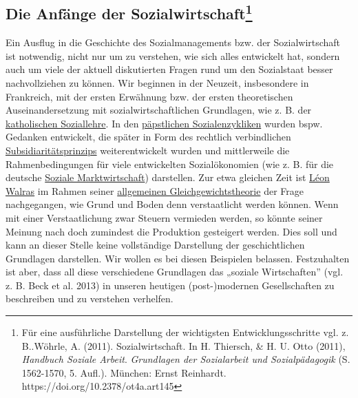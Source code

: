 \documentclass[
  letterpaper,
]{book}
\begin{document}
\subsection[Die Anfänge der Sozialwirtschaft]{\texorpdfstring{Die
Anfänge der
Sozialwirtschaft\footnote{Für eine ausführliche Darstellung der
  wichtigsten Entwicklungsschritte vgl. z. B..Wöhrle, A. (2011).
  Sozialwirtschaft. In H. Thiersch, \& H. U. Otto (2011), \emph{Handbuch
  Soziale Arbeit}. \emph{Grundlagen der Sozialarbeit und
  Sozialpädagogik} (S. 1562-1570, 5. Aufl.). München: Ernst Reinhardt.
  https://doi.org/10.2378/ot4a.art145}}{Die Anfänge der Sozialwirtschaft}}\label{die-anfaenge-der-sozialwirtschaft}

Ein Ausflug in die Geschichte des Sozialmanagements bzw. der
Sozialwirtschaft ist notwendig, nicht nur um zu verstehen, wie sich
alles entwickelt hat, sondern auch um viele der aktuell diskutierten
Fragen rund um den Sozialstaat besser nachvollziehen zu können. Wir
beginnen in der Neuzeit, insbesondere in Frankreich, mit der ersten
Erwähnung bzw. der ersten theoretischen Auseinandersetzung mit
sozialwirtschaftlichen Grundlagen, wie z. B. der
\href{https://de.wikipedia.org/wiki/Katholische_Soziallehre}{katholischen
Soziallehre}. In den
\href{https://de.wikipedia.org/wiki/Sozialenzyklika}{päpstlichen
Sozialenzykliken} wurden bspw. Gedanken entwickelt, die später in Form
des rechtlich verbindlichen
\href{https://www.bpb.de/kurz-knapp/lexika/pocket-europa/16951/subsidiaritaetsprinzip/}{Subsidiaritätsprinzips}
weiterentwickelt wurden und mittlerweile die Rahmenbedingungen für viele
entwickelten Sozialökonomien (wie z. B. für die deutsche
\href{https://www.bpb.de/kurz-knapp/lexika/lexikon-der-wirtschaft/20642/soziale-marktwirtschaft/}{Soziale
Marktwirtschaft}) darstellen. Zur etwa gleichen Zeit ist
\href{https://de.wikipedia.org/wiki/L\%C3\%A9on_Walras}{Léon Walras} im
Rahmen seiner
\href{https://de.wikipedia.org/wiki/Walrasianisches_allgemeines_Gleichgewichtsmodell}{allgemeinen
Gleichgewichtstheorie} der Frage nachgegangen, wie Grund und Boden denn
verstaatlicht werden können. Wenn mit einer Verstaatlichung zwar Steuern
vermieden werden, so könnte seiner Meinung nach doch zumindest die
Produktion gesteigert werden. Dies soll und kann an dieser Stelle keine
vollständige Darstellung der geschichtlichen Grundlagen darstellen. Wir
wollen es bei diesen Beispielen belassen. Festzuhalten ist aber, dass
all diese verschiedene Grundlagen das „soziale Wirtschaften'' (vgl. z.
B. Beck et al. 2013) in unseren heutigen (post-)modernen Gesellschaften
zu beschreiben und zu verstehen verhelfen.
\end{document}
